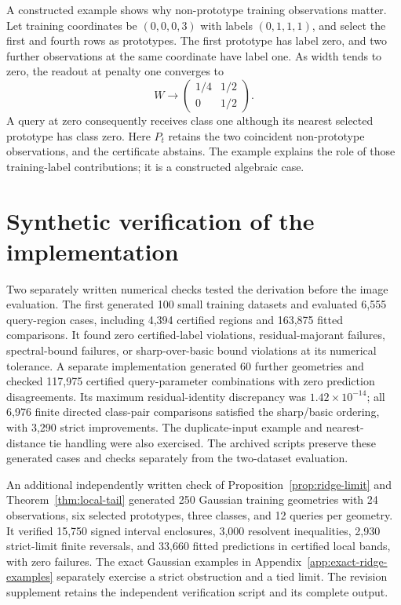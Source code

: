 \documentclass[preprint,12pt,authoryear]{elsarticle}
\begin{document}
A constructed example shows why non-prototype training observations matter. Let training coordinates be $(0,0,0,3)$ with labels $(0,1,1,1)$, and select the first and fourth rows as prototypes. The first prototype has label zero, and two further observations at the same coordinate have label one. As width tends to zero, the readout at penalty one converges to
\[
 W\longrightarrow
 \begin{pmatrix}1/4&1/2\\0&1/2\end{pmatrix}.
\]
A query at zero consequently receives class one although its nearest selected prototype has class zero. Here $P_t$ retains the two coincident non-prototype observations, and the certificate abstains. The example explains the role of those training-label contributions; it is a constructed algebraic case.

\section{Synthetic verification of the implementation}
Two separately written numerical checks tested the derivation before the image evaluation. The first generated 100 small training datasets and evaluated 6,555 query-region cases, including 4,394 certified regions and 163,875 fitted comparisons. It found zero certified-label violations, residual-majorant failures, spectral-bound failures, or sharp-over-basic bound violations at its numerical tolerance. A separate implementation generated 60 further geometries and checked 117,975 certified query-parameter combinations with zero prediction disagreements. Its maximum residual-identity discrepancy was $1.42\times10^{-14}$; all 6,976 finite directed class-pair comparisons satisfied the sharp/basic ordering, with 3,290 strict improvements. The duplicate-input example and nearest-distance tie handling were also exercised. The archived scripts preserve these generated cases and checks separately from the two-dataset evaluation.

An additional independently written check of Proposition~\ref{prop:ridge-limit} and Theorem~\ref{thm:local-tail} generated 250 Gaussian training geometries with 24 observations, six selected prototypes, three classes, and 12 queries per geometry. It verified 15,750 signed interval enclosures, 3,000 resolvent inequalities, 2,930 strict-limit finite reversals, and 33,660 fitted predictions in certified local bands, with zero failures. The exact Gaussian examples in Appendix~\ref{app:exact-ridge-examples} separately exercise a strict obstruction and a tied limit. The revision supplement retains the independent verification script and its complete output.
\end{document}
